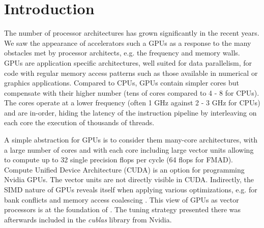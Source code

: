 \section{Introduction}
The number of processor architectures has grown significantly in the recent
years. We saw the appearance of accelerators such a GPUs as a response to the
many obstacles met by processor architects, e.g. the frequency and memory walls.
GPUs are application specific architectures, well suited for data parallelism,
for code with regular memory access patterns such as those available in
numerical or graphics applications. Compared to CPUs, GPUs contain simpler cores
but compensate with their higher number (tens of cores compared to 4 - 8 for
CPUs). The cores operate at a lower frequency (often 1 GHz against 2 - 3 GHz for
CPUs) and are in-order, hiding the latency of the instruction pipeline by
interleaving on each core the execution of thousands of threads.

A simple abstraction for GPUs is to consider them many-core architectures, with
a large number of cores and with each core including large vector units
allowing to compute up to 32 single precision flops per cycle (64 flops for
FMAD). Compute Unified Device Architecture (CUDA) is an option for programming
Nvidia GPUs. The vector units are not directly visible in CUDA. Indirectly, the
SIMD nature of GPUs reveals itself when applying various optimizations, e.g. for
bank conflicts and memory access coalescing \cite{cuda}. This view of GPUs as
vector processors is at the foundation of \cite{volkov2008}. The tuning strategy
presented there was afterwards included in the \textit{cublas} library from
Nvidia.


